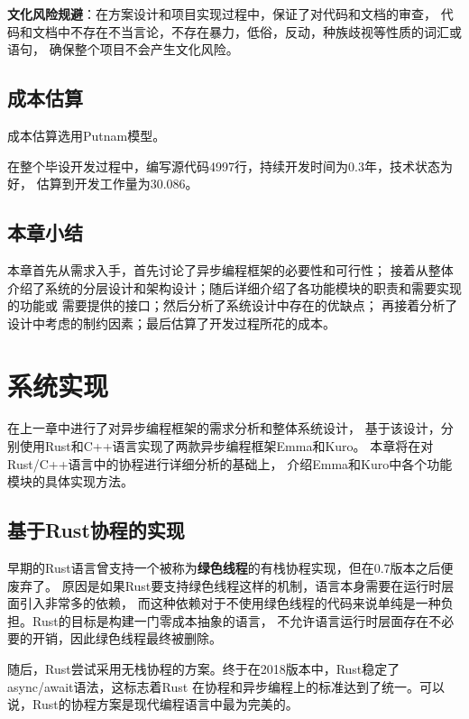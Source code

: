 \documentclass[supercite]{HustGraduPaper}
\theoremstyle{definition}
\begin{document}
\textbf{文化风险规避}：在方案设计和项目实现过程中，保证了对代码和文档的审查，
代码和文档中不存在不当言论，不存在暴力，低俗，反动，种族歧视等性质的词汇或语句，
确保整个项目不会产生文化风险。\par

\subsection{成本估算}

成本估算选用Putnam模型。\par

在整个毕设开发过程中，编写源代码4997行，持续开发时间为0.3年，技术状态为好，
估算到开发工作量为30.086。\par

\subsection{本章小结}

本章首先从需求入手，首先讨论了异步编程框架的必要性和可行性；
接着从整体介绍了系统的分层设计和架构设计；随后详细介绍了各功能模块的职责和需要实现的功能或
需要提供的接口；然后分析了系统设计中存在的优缺点；
再接着分析了设计中考虑的制约因素；最后估算了开发过程所花的成本。\par

\section{系统实现}

在上一章中进行了对异步编程框架的需求分析和整体系统设计，
基于该设计，分别使用Rust和C++语言实现了两款异步编程框架Emma和Kuro。
本章将在对Rust/C++语言中的协程进行详细分析的基础上，
介绍Emma和Kuro中各个功能模块的具体实现方法。\par

\subsection{基于Rust协程的实现}
早期的Rust语言曾支持一个被称为\textbf{绿色线程}\cite{rosendahl2017green}的有栈协程实现，但在0.7版本之后便废弃了。
原因是如果Rust要支持绿色线程这样的机制，语言本身需要在运行时层面引入非常多的依赖，
而这种依赖对于不使用绿色线程的代码来说单纯是一种负担。Rust的目标是构建一门零成本抽象的语言，
不允许语言运行时层面存在不必要的开销，因此绿色线程最终被删除。\par

随后，Rust尝试采用无栈协程的方案。终于在2018版本中，Rust稳定了async/await语法，这标志着Rust
在协程和异步编程上的标准达到了统一。可以说，Rust的协程方案是现代编程语言中最为完美的。\par
\end{document}
